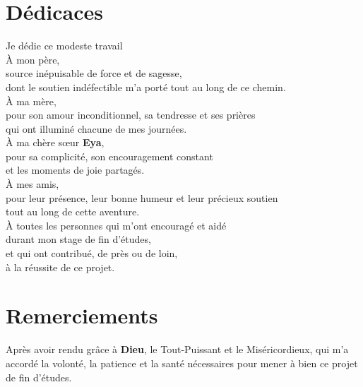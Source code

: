 \documentclass[12pt,a4paper,twoside]{report}
\begin{document}
\chapter*{Dédicaces}

\vspace{3cm}

\begin{center}
\itshape\large

Je dédie ce modeste travail\\[0.6cm]

À mon père,\\
source inépuisable de force et de sagesse,\\
dont le soutien indéfectible m'a porté tout au long de ce chemin.\\[0.6cm]

À ma mère,\\
pour son amour inconditionnel, sa tendresse et ses prières\\
qui ont illuminé chacune de mes journées.\\[0.6cm]

À ma chère sœur \textbf{Eya},\\
pour sa complicité, son encouragement constant\\
et les moments de joie partagés.\\[0.6cm]

À mes amis,\\
pour leur présence, leur bonne humeur et leur précieux soutien\\
tout au long de cette aventure.\\[0.6cm]

À toutes les personnes qui m'ont encouragé et aidé\\
durant mon stage de fin d'études,\\
et qui ont contribué, de près ou de loin,\\
à la réussite de ce projet.

\end{center}

\newpage

\chapter*{Remerciements}

Après avoir rendu grâce à \textbf{Dieu}, le Tout-Puissant et le Miséricordieux, qui m'a accordé la volonté, la patience et la santé nécessaires pour mener à bien ce projet de fin d'études.
\end{document}

